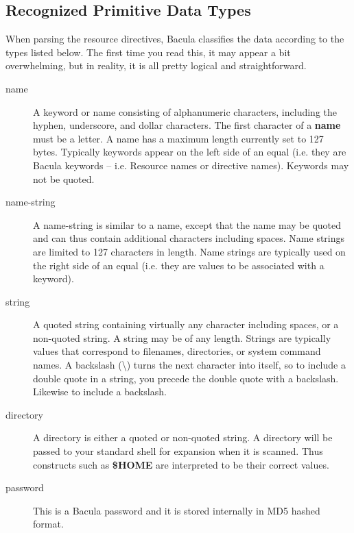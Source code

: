 \label{DataTypes}
\subsection{Recognized Primitive Data Types}

When parsing the resource directives, Bacula classifies the data according to
the types listed below. The first time you read this, it may appear a bit
overwhelming, but in reality, it is all pretty logical and straightforward. 

\begin{description}

\item [name]
   A keyword or name consisting of alphanumeric characters, including the
hyphen, underscore, and dollar  characters. The first character of a {\bf
name} must be  a letter.  A name has a maximum length currently set to 127
bytes.  Typically keywords appear on the left side of an equal (i.e.  they are
Bacula keywords -- i.e. Resource names or  directive names). Keywords may not
be quoted.  

\item [name-string]
   A name-string is similar to a name,  except that the name may be quoted and
can thus contain  additional characters including spaces. Name strings  are
limited to 127 characters in length. Name strings  are typically used on the
right side of an equal (i.e.  they are values to be associated with a keyword).


\item [string]
   A quoted string containing virtually any  character including spaces, or a
non-quoted string. A  string may be of any length. Strings are typically
values  that correspond to filenames, directories, or system  command names. A
backslash (\textbackslash{}) turns the next character into  itself, so to
include a double quote in a string, you precede the  double quote with a
backslash. Likewise to include a backslash. 

\item [directory]
   A directory is either a quoted or  non-quoted string. A directory will be
passed to your  standard shell for expansion when it is scanned. Thus 
constructs such as {\bf \$HOME} are interpreted to be  their correct values. 

\item [password]
   This is a Bacula password and it is stored internally in MD5 hashed format. 


\end{description}
